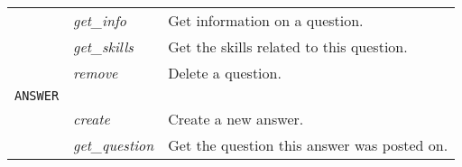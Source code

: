\begin{table}
\begin{center}
\begin{tabular}{p{70px} | p{70px} | p{210px}}
															& \emph{get\_info}				& Get information on a question. \\
															& \emph{get\_skills}			& Get the skills related to this question. \\
															& \emph{remove}						& Delete a question. \\
				\hline
				\texttt{ANSWER}				& 												&	\\
				\hline
															& \emph{create}						& Create a new answer. \\
															& \emph{get\_question}		& Get the question this answer was posted on. \\
				\hline
				\hline
		\end{tabular}
	\end{center}
	
\end{table}

